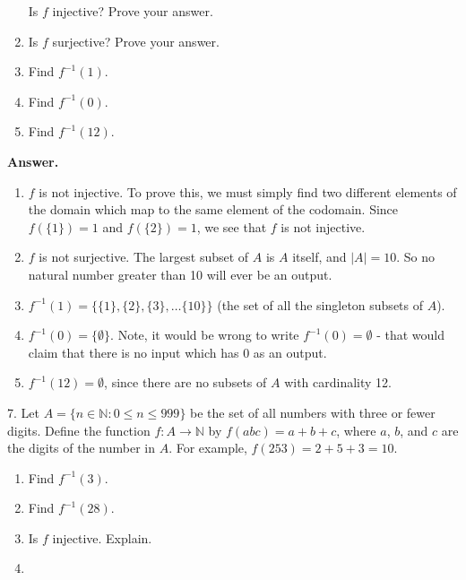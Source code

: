 \documentclass[10pt,]{book}
\theoremstyle{plain}
\theoremstyle{definition}
\theoremstyle{definition}
\theoremstyle{definition}
\numberwithin{equation}{section}
\def\N{\mathbb N}
\def\inv{^{-1}}
\def\st{:}
\begin{document}
\begin{exerciselist}
\begin{enumerate}[label=(\alph*)]
Is \(f\) injective?  Prove your answer.
%
\item\hypertarget{li-206}{}
Is \(f\) surjective?  Prove your answer.
%
\item\hypertarget{li-207}{}
Find \(f\inv(1)\).
%
\item\hypertarget{li-208}{}
Find \(f\inv(0)\).
%
\item\hypertarget{li-209}{}
Find \(f\inv(12)\).
%
\end{enumerate}
\par\smallskip
\par\smallskip
\noindent\textbf{Answer.}\hypertarget{answer-22}{}\quad
\leavevmode%
\begin{enumerate}[label=(\alph*)]
\item\hypertarget{li-210}{}\(f\) is not injective.  To prove this, we must simply find two different elements of the domain which map to the same element of the codomain.  Since \(f(\{1\}) = 1\) and \(f(\{2\}) = 1\), we see that \(f\) is not injective.\item\hypertarget{li-211}{}\(f\) is not surjective.  The largest subset of \(A\) is \(A\) itself, and \(|A| = 10\).  So no natural number greater than 10 will ever be an output.\item\hypertarget{li-212}{}\(f\inv(1) = \{\{1\}, \{2\}, \{3\}, \ldots \{10\}\}\) (the set of all the singleton subsets of \(A\)).\item\hypertarget{li-213}{}\(f\inv(0) = \{\emptyset\}\).  Note, it would be wrong to write \(f\inv(0) = \emptyset\) - that would claim that there is no input which has 0 as an output.\item\hypertarget{li-214}{}\(f\inv(12) = \emptyset\), since there are no subsets of \(A\) with cardinality 12.\end{enumerate}
\item[7.]\hypertarget{exercise-23}{}
Let \(A = \{n \in \N \st 0 \le n \le 999\}\) be the set of all numbers with three or fewer digits. Define the function \(f:A \to \N\) by \(f(abc) = a+b+c\), where \(a\), \(b\), and \(c\) are the digits of the number in \(A\). For example, \(f(253) = 2 + 5 + 3 =  10\).
%
\leavevmode%
\begin{enumerate}[label=(\alph*)]
\item\hypertarget{li-215}{}
Find \(f\inv(3)\).
%
\item\hypertarget{li-216}{}
Find \(f\inv(28)\).
%
\item\hypertarget{li-217}{}
Is \(f\) injective.  Explain.
%
\item\hypertarget{li-218}{}

\end{enumerate}
\end{exerciselist}
\end{document}
